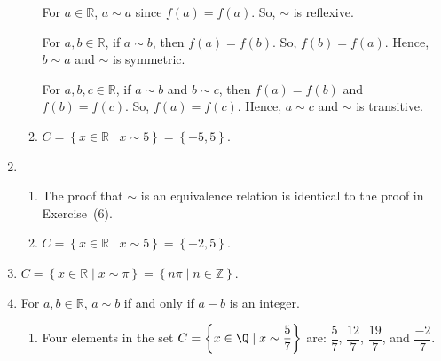 \begin{enumerate}
\begin{enumerate}
For $a \in \mathbb{R}$, $a \sim a$ since $f \left( a \right) = f \left( a \right)$.  So, $\sim$ is reflexive.

For $a, b \in \mathbb{R}$, if $a \sim b$, then  $f \left( a \right) = f \left( b \right)$.  So, 
$f \left( b \right) = f \left( a \right)$. Hence, $b \sim a$ and $\sim$ is symmetric.

For $a, b,c  \in \mathbb{R}$, if $a \sim b$ and $b \sim c$, then  
$f \left( a \right) = f \left( b \right)$ and $f \left( b \right) = f \left( c \right)$.  So, 
$f \left( a \right) = f \left( c \right)$. Hence, $a \sim c$ and $\sim$ is transitive.

\item  $C = \left\{ { {x \in \mathbb{R} } \mid x \sim 5} \right\} = \left\{ -5, 5 \right\}$.
\end{enumerate}



\item \begin{enumerate}
\item The proof that $\sim$ is an equivalence relation is identical to the proof in Exercise~(6).

\item  $C = \left\{ { {x \in \mathbb{R} } \mid x \sim 5} \right\} = \left\{ -2, 5 \right\}$.
\end{enumerate}



\item $C = \left\{ { {x \in \mathbb{R} } \mid x \sim \pi} \right\} = 
\left\{ n \pi \mid n \in \mathbb{Z} \right\}$.



\item For  $a, b \in \mathbb{R}$,  $a \sim b$  if and only if   $a - b$  is an integer.
\begin{enumerate}
%
%
%

\item Four elements in the set $C = \left\{ { {x \in \Q } \mid x \sim \dfrac{5}{7} } \right\}$ are:  $\dfrac{5}{7}$, $\dfrac{12}{7}$, $\dfrac{19}{7}$, and $\dfrac{-2}{7}$.


\end{enumerate}
\end{enumerate}
